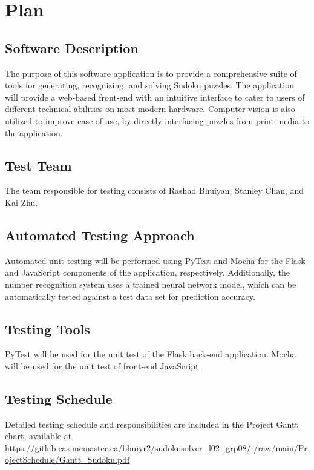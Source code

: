 \documentclass[11pt]{article}
\begin{document}
\newpage

\section{Plan}
	
\subsection{Software Description}
The purpose of this software application is to provide a comprehensive suite of tools for generating, recognizing, and solving Sudoku puzzles. The application will provide a web-based front-end with an intuitive interface to cater to users of different technical abilities on most modern hardware. Computer vision is also utilized to improve ease of use, by directly interfacing puzzles from print-media to the application.

\subsection{Test Team}
The team responsible for testing consists of Rashad Bhuiyan, Stanley Chan, and Kai Zhu.

\subsection{Automated Testing Approach}
Automated unit testing will be performed using PyTest and Mocha for the Flask and JavaScript components of the application, respectively. Additionally, the number recognition system uses a trained neural network model, which can be automatically tested against a test data set for prediction accuracy.

\subsection{Testing Tools}
PyTest will be used for the unit test of the Flask back-end application. Mocha will be used for the unit test of front-end JavaScript.

\subsection{Testing Schedule}
		
Detailed testing schedule and responsibilities are included in the Project Gantt chart, available at  \url{https://gitlab.cas.mcmaster.ca/bhuiyr2/sudokusolver_l02_grp08/-/raw/main/ProjectSchedule/Gantt_Sudoku.pdf}
\end{document}
